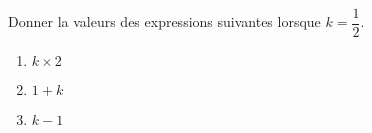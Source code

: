 
\begin{exercice}\label{exo2smath-0162}

    Donner la valeurs des expressions suivantes lorsque \( k=\dfrac{ 1 }{2}\).
    \begin{multicols}{3}
    \begin{enumerate}
        \item
            \( k\times 2\)
        \item
            \( 1+k\)
        \item
            \( k-1\)
    \end{enumerate}
    \end{multicols}

\end{exercice}
